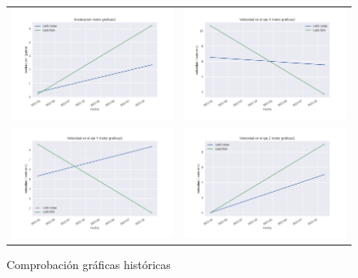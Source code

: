 \documentclass[12pt]{article}
\begin{document}
\begin{refsegment}
    \begin{figure}[H]
        \centering
        \caption{Comprobación gráficas históricas}
        \begin{tabular}{m{8cm}m{8cm}}
            \includegraphics[width=8cm]{comprobacion_resultados/finales/as_graficas1.png}&
            \includegraphics[width=8cm]{comprobacion_resultados/finales/vxs_graficas1.png}\\
            \includegraphics[width=8cm]{comprobacion_resultados/finales/vys_graficas1.png}&
            \includegraphics[width=8cm]{comprobacion_resultados/finales/vzs_graficas1.png}\\

\end{tabular}
\end{figure}
\end{refsegment}
\end{document}
